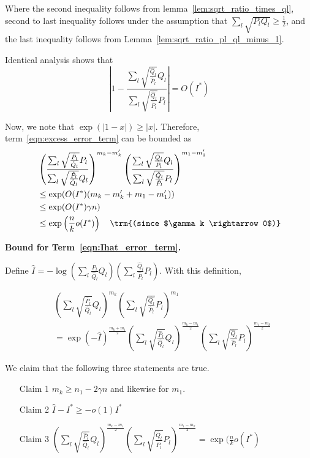 \documentclass{article}
\begin{document}
Where the second inequality follows from lemma~\ref{lem:sqrt_ratio_times_ql},
second to last inequality follows under the assumption that $\sum_l \sqrt{P_l Q_l} \geq \frac{1}{2}$, and the last inequality follows from Lemma~\ref{lem:sqrt_ratio_pl_ql_minus_1}. 

Identical analysis shows that
\[
\left| 1 - \frac{ \sum_l \sqrt{\frac{\hat{Q}_l}{\hat{P}_l} } Q_l}
             { \sum_l \sqrt{\frac{\hat{Q}_l}{\hat{P}_l} } P_l} \right| 
= O(I^*) 
\]

Now, we note that $\exp( | 1 - x | ) \geq |x|$. 
Therefore, term~\ref{eqn:excess_error_term} can be bounded as
\begin{align*}
&  \left( \frac{\sum_l \sqrt{\frac{\hat{P}_l}{\hat{Q}_l} } P_l}
                {\sum_l \sqrt{\frac{\hat{P}_l}{\hat{Q}_l} } Q_l}  \right)^{m_k - m_k'}
 \left( \frac{ \sum_l \sqrt{\frac{\hat{Q}_l}{\hat{P}_l} } Q_l}
             { \sum_l \sqrt{\frac{\hat{Q}_l}{\hat{P}_l} } P_l} \right)^{m_1 - m_1'}  \\
&\leq \exp( O(I^*) (m_k - m_k' + m_1 - m_1') ) \\
&\leq \exp( O(I^*) \gamma n) \\
&\leq \exp\left( \frac{n}{k} o(I^*) \right) \quad \trm{(since $\gamma k \rightarrow 0$)}
\end{align*}

\textbf{Bound for Term~\ref{eqn:Ihat_error_term}.}


Define 
$\hat{I} = - \log \left( \sum_l \frac{\hat{P}_l}{\hat{Q}_l} Q_l \right) \left( \sum_l \frac{\hat{Q}_l}{\hat{P}_l} P_l \right) $. 
With this definition, 

\begin{align*}
& \left( \sum_l \sqrt{\frac{\hat{P}_l}{\hat{Q}_l} } Q_l \right)^{m_k} 
       \left( \sum_l \sqrt{\frac{\hat{Q_l}}{\hat{P}_l} } P_l \right)^{m_1} \\
&= \exp( - \hat{I} )^{\frac{m_k + m_1}{2}}  \left( \sum_l \sqrt{\frac{\hat{P}_l}{\hat{Q}_l}} Q_l \right)^{\frac{m_k - m_1}{2}} 
 \left( \sum_l \sqrt{\frac{\hat{Q}_l}{\hat{P}_l}} P_l \right)^{\frac{m_1 - m_k}{2}} 
\end{align*}

We claim that the following three statements are true. 
\begin{enumerate}
\item[Claim 1] $m_k \geq n_1 - 2 \gamma n$ and likewise for $m_1$.
\item[Claim 2] $\hat{I} - I^* \geq - o(1) I^*$
\item[Claim 3] $\left( \sum_l \sqrt{\frac{\hat{P}_l}{\hat{Q}_l}} Q_l \right)^{\frac{m_k - m_1}{2}} 
 \left( \sum_l \sqrt{\frac{\hat{Q}_l}{\hat{P}_l}} P_l \right)^{\frac{m_1 - m_k}{2}} = \exp(\frac{n}{k}  o(I^*)  $
\end{enumerate}
\end{document}
